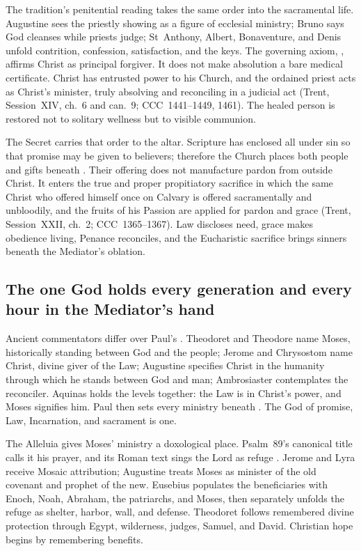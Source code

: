 The tradition's penitential reading takes the same order into the sacramental
life. Augustine sees the priestly showing as a figure of ecclesial ministry;
Bruno says God cleanses while priests judge; St~Anthony, Albert, Bonaventure,
and Denis unfold contrition, confession, satisfaction, and the keys. The
governing axiom, , affirms Christ as
principal forgiver. It does not make absolution a bare medical certificate.
Christ has entrusted power to his Church, and the ordained priest acts as
Christ's minister, truly absolving and reconciling in a judicial act (Trent,
Session~XIV, ch.~6 and can.~9; CCC~1441--1449, 1461). The healed person is restored not to
solitary wellness but to visible communion.

The Secret carries that order to the altar. Scripture has enclosed all under
sin so that promise may be given to believers; therefore the Church places
both people and gifts beneath . Their offering does not
manufacture pardon from outside Christ. It enters the true and proper
propitiatory sacrifice in which the same Christ who offered himself once on
Calvary is offered sacramentally and unbloodily, and the fruits of his Passion
are applied for pardon and grace (Trent, Session~XXII, ch.~2; CCC~1365--1367).
Law discloses need, grace makes obedience living, Penance reconciles, and the
Eucharistic sacrifice brings sinners beneath the Mediator's oblation.

\subsection*{The one God holds every generation and every hour in the Mediator's hand\enspace
  }

Ancient commentators differ over Paul's . Theodoret
and Theodore name Moses, historically standing between God and the people;
Jerome and Chrysostom name Christ, divine giver of the Law; Augustine specifies
Christ in the humanity through which he stands between God and man;
Ambrosiaster contemplates the reconciler. Aquinas holds the levels together:
the Law is in Christ's power, and Moses signifies him. Paul then sets every
ministry beneath . The God of promise, Law,
Incarnation, and sacrament is one.

The Alleluia gives Moses' ministry a doxological place. Psalm~89's canonical
title calls it his prayer, and its Roman text sings the Lord as refuge
. Jerome and Lyra receive Mosaic attribution;
Augustine treats Moses as minister of the old covenant and prophet of the new.
Eusebius populates the beneficiaries with Enoch, Noah, Abraham, the patriarchs,
and Moses, then separately unfolds the refuge as shelter, harbor, wall, and
defense. Theodoret follows remembered divine protection through Egypt,
wilderness, judges, Samuel, and David. Christian hope begins by remembering
benefits.

